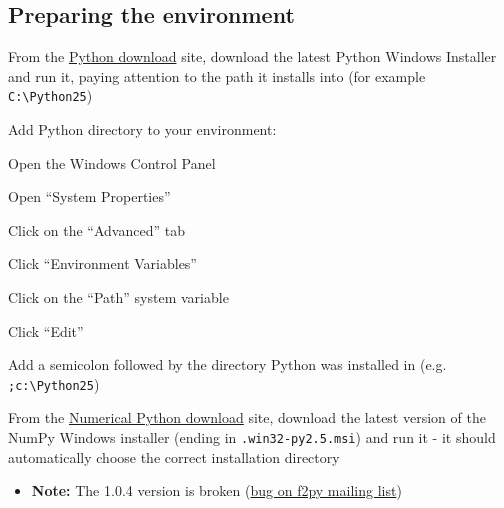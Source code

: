 \documentclass[10pt,a4paper,english]{article}
\begin{document}
\subsection*{Preparing the environment}
\setcounter{listcnt0}{0}
\begin{list}{.}
{
\setlength{\rightmargin}{\leftmargin}
}
\item {} 
From the \href{http://www.python.org/download/}{Python download} site, download the latest Python Windows Installer and run it,
paying attention to the path it installs into (for example \texttt{C:{\textbackslash}Python25})

\item {} 
Add Python directory to your environment:
\begin{list}{.}
{
\setlength{\rightmargin}{\leftmargin}
}
\item {} 
Open the Windows Control Panel

\item {} 
Open ``System Properties''

\item {} 
Click on the ``Advanced'' tab

\item {} 
Click ``Environment Variables''

\item {} 
Click on the ``Path'' system variable

\item {} 
Click ``Edit''

\item {} 
Add a semicolon followed by the directory Python was installed in (e.g. \texttt{;c:{\textbackslash}Python25})

\end{list}

\item {} 
From the \href{http://sourceforge.net/project/showfiles.php?group_id=1369&package_id=175103}{Numerical Python download} site, download the latest version of the NumPy Windows
installer (ending in \texttt{.win32-py2.5.msi}) and run it - it should automatically choose the
correct installation directory
\begin{itemize}
\item {} 
\textbf{Note:} The 1.0.4 version is broken (\href{http://cens.ioc.ee/pipermail/f2py-users/2007-November/001487.html}{bug on f2py mailing list})

\end{itemize}


\end{list}
\end{document}

